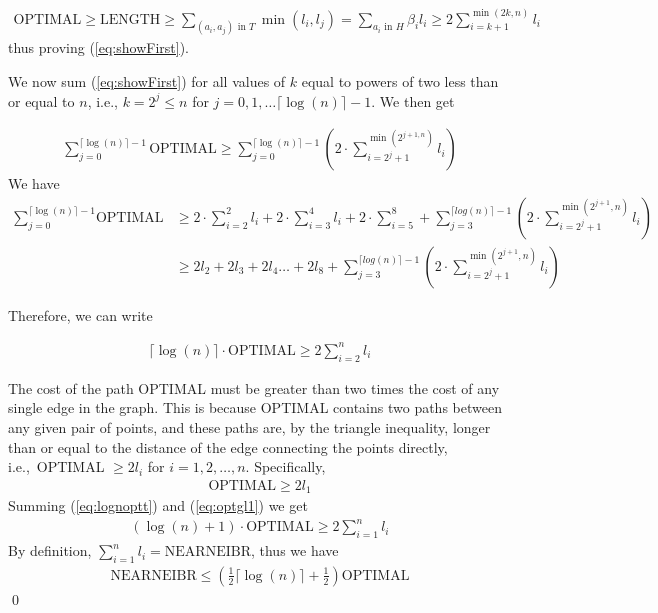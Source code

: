 \begin{align*}
\text{OPTIMAL} \geq \text{LENGTH} \geq \sum_{(a_i,a_j) \text{ in } T} \min(l_i,l_j) = \sum_{a_i \text{ in } H} \beta_i l_i \geq 2 \sum_{i=k+1}^{\min(2k,n)} l_i
\end{align*}
thus proving (\ref{eq:showFirst}). 

We now sum (\ref{eq:showFirst}) for all values of $k$ equal to powers of two less than or equal to $n$, i.e., $k = 2^{j} \leq n$ for $j = 0, 1, \dots \lceil \log(n) \rceil - 1$. We then get

\begin{align*}
\sum_{j=0}^{\lceil \log(n) \rceil -1} \text{OPTIMAL} \geq \sum_{j=0}^{\lceil \log(n) \rceil - 1} ( 2 \cdot \sum_{i=2^j + 1}^{\min(2^{j+1,n})} l_i )
\end{align*}
We have
\begin{align*}
\sum_{j=0}^{\lceil \log(n) \rceil -1} \text{OPTIMAL} &\geq 2 \cdot \sum_{i=2}^2 l_i + 2 \cdot \sum_{i=3}^4 l_i + 2 \cdot \sum_{i=5}^8 + \sum_{j=3}^{\lceil log(n) \rceil - 1} (2 \cdot \sum_{i = 2^j+1}^{\min(2^{j+1},n)} l_i )\\
& \geq 2 l_2 + 2 l_3 + 2 l_4 \dots +2l_8 + \sum_{j=3}^{\lceil log(n) \rceil - 1} (2 \cdot \sum_{i = 2^j+1}^{\min(2^{j+1},n)} l_i)
\end{align*}

Therefore, we can write

\begin{align}
\lceil \log(n) \rceil \cdot \text{OPTIMAL} \geq 2 \sum_{i = 2}^n l_i \label{eq:lognoptt}
\end{align}

The cost of the path OPTIMAL must be greater than two times the cost of any single edge in the graph. This is because OPTIMAL contains two paths between any given pair of points, and these paths are, by the triangle inequality, longer than or equal to the distance of the edge connecting the points directly, i.e.,\ OPTIMAL $\geq 2 l_i$ for $i = 1,2,\dots, n$. Specifically,
\begin{align}
\text{OPTIMAL} \geq 2 l_1 \label{eq:optgl1}
\end{align}
Summing (\ref{eq:lognoptt}) and (\ref{eq:optgl1}) we get 
\begin{align*}
(\log(n)+1) \cdot \text{OPTIMAL} \geq 2 \sum_{i=1}^n l_i
\end{align*}
By definition, $\sum_{i=1}^n l_i = \text{NEARNEIBR}$, thus we have 
\begin{align*}
\text{NEARNEIBR} \leq (\frac{1}{2} \lceil \log(n) \rceil + \frac{1}{2}) \text{OPTIMAL}
\end{align*}
\qed 


